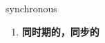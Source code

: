 
\begin{frame}
{\huge synchronous}
\begin{center}
\begin{enumerate}\Large
  \item \textbf{同时期的，同步的}
\end{enumerate}
\end{center}
\end{frame}
